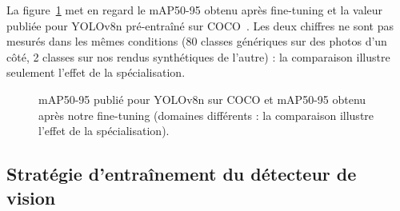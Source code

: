 \documentclass[12pt,a4paper,titlepage]{article}
\begin{document}
La figure~\ref{fig:chart_map} met en regard le mAP50-95 obtenu après fine-tuning et la valeur publiée pour YOLOv8n pré-entraîné sur COCO~\cite{ultralytics_yolov8}. Les deux chiffres ne sont pas mesurés dans les mêmes conditions (80 classes génériques sur des photos d'un côté, 2 classes sur nos rendus synthétiques de l'autre) : la comparaison illustre seulement l'effet de la spécialisation.

\begin{figure}[H]
    \centering
    \caption{mAP50-95 publié pour YOLOv8n sur COCO et mAP50-95 obtenu après notre fine-tuning (domaines différents : la comparaison illustre l'effet de la spécialisation).}
    \label{fig:chart_map}
\end{figure}

\subsection{Stratégie d'entraînement du détecteur de vision}
\label{subsec:choix_vision_strategie}
\end{document}
